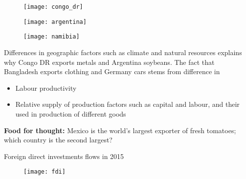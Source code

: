 \documentclass{beamer}
\begin{document}
\begin{frame}
  \begin{figure}\centering
    \texttt{[image: congo\_dr]}
  \end{figure}
\end{frame}

\begin{frame}
  \begin{figure}\centering
    \texttt{[image: argentina]}
  \end{figure}
\end{frame}

\begin{frame}
  \begin{figure}\centering
    \texttt{[image: namibia]}
  \end{figure}
\end{frame}

\begin{frame}{}
Differences in geographic factors such as climate and natural resources explains why Congo DR exports metals and Argentina soybeans.
\newline
The fact that Bangladesh exports clothing and Germany cars stems from difference in
\begin{itemize}
  \item Labour productivity
  \item Relative supply of production factors such as capital and labour, and their used in production of different goods
\end{itemize}
  \bigskip
 \textbf{Food for thought:} Mexico is the world's largest exporter of fresh tomatoes; which country is the second largest?
\end{frame}

\begin{frame}{Foreign direct investments flows in 2015}
  \begin{figure}
    \texttt{[image: fdi]}  
  \end{figure}  
\end{frame}
\end{document}
